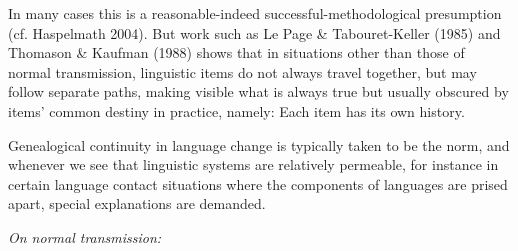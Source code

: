 In many cases this is a reasonable-indeed successful-methodological 
presumption (cf. Haspelmath 2004). But work such as Le Page \& 
Tabouret-Keller (1985) and Thomason \& Kaufman (1988) shows that in 
situations other than those of normal transmission, linguistic items do 
not always travel together, but may follow separate paths, making 
visible what is always true but usually obscured by items' common 
destiny in practice, namely: Each item has its own history. 



Genealogical continuity in language change is typically taken to be the 
norm, and whenever we see that linguistic systems are relatively 
permeable, for instance in certain language contact situations where the 
components of languages are prised apart, special explanations are 
demanded. 

\textit{On normal transmission:}

